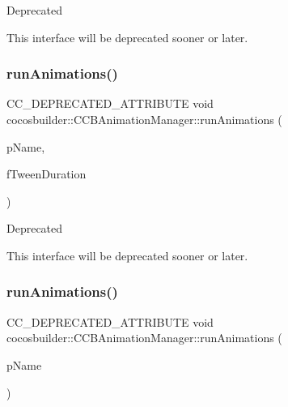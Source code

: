 \begin{DoxyRefDesc}{Deprecated}
\item[\hyperlink{deprecated__deprecated000073}{Deprecated}]This interface will be deprecated sooner or later. \end{DoxyRefDesc}
\mbox{\label{classcocosbuilder_1_1CCBAnimationManager_aa17fe6b5bc1538a4eb3178705d043a51}} 
\subsubsection{\texorpdfstring{run\+Animations()}{runAnimations()}\hspace{0.1cm}{\footnotesize\ttfamily [4/6]}}
{\footnotesize\ttfamily C\+C\+\_\+\+D\+E\+P\+R\+E\+C\+A\+T\+E\+D\+\_\+\+A\+T\+T\+R\+I\+B\+U\+TE void cocosbuilder\+::\+C\+C\+B\+Animation\+Manager\+::run\+Animations (\begin{DoxyParamCaption}\item[{const char $\ast$}]{p\+Name,  }\item[{float}]{f\+Tween\+Duration }\end{DoxyParamCaption})}

\begin{DoxyRefDesc}{Deprecated}
\item[\hyperlink{deprecated__deprecated000306}{Deprecated}]This interface will be deprecated sooner or later. \end{DoxyRefDesc}
\mbox{\label{classcocosbuilder_1_1CCBAnimationManager_a0943033ca5e90361444b74f0c1d8a8ec}} 
\subsubsection{\texorpdfstring{run\+Animations()}{runAnimations()}\hspace{0.1cm}{\footnotesize\ttfamily [5/6]}}
{\footnotesize\ttfamily C\+C\+\_\+\+D\+E\+P\+R\+E\+C\+A\+T\+E\+D\+\_\+\+A\+T\+T\+R\+I\+B\+U\+TE void cocosbuilder\+::\+C\+C\+B\+Animation\+Manager\+::run\+Animations (\begin{DoxyParamCaption}\item[{const char $\ast$}]{p\+Name }\end{DoxyParamCaption})}

